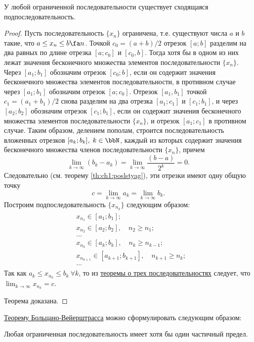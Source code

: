 \begin{thm}\label{th:ch1:TBV}
 У любой ограниченной последовательности существует сходящаяся подпоследовательность.
\end{thm}
\begin{proof}
Пусть последовательность $\{x_n\}$ ограничена, т.е. существуют числа $a$ и $b$ такие, что $a \le x_n \le b \fa n$. Точкой
$c_0 = (a + b)/2$ отрезок $[a; b]$ разделим на два равных по длине отрезка $[a; c_0]$ и $[c_0,b]$. Тогда хотя бы в одном из них лежат значения бесконечного множества элементов последовательности $\{x_n\}$. Через $[a_1;b_1]$ обозначим отрезок $[c_0;b]$, если он содержит значения бесконечного множества элементов последовательности, в противном случае через $[a_1; b_1]$ обозначим отрезок $[a; c_0]$. Отрезок $[a_1, b_1]$ точкой $c_1 = (a_1 + b_1)/2$ снова разделим на два отрезка $[a_1;c_1]$ и $[c_1;b_1]$, и через $[a_2;b_2]$ обозначим отрезок $[c_1;b_1]$, если он содержит значения бесконечного множества элементов последовательности $\{x_n\}$, и отрезок $[a_1; c_1]$ в противном случае. Таким образом, делением пополам, строится последовательность вложенных отрезков $[a_k;b_k],\; k \in \bbN$, каждый из которых содержит значения бесконечного множества членов последовательности $\{x_n\}$, причем
$$
\lim_{k\to \infty}(b_k-a_k)=\lim_{k \to \infty}\frac{(b-a)}{2^k}=0.
$$
Следовательно (см. теорему \ref{th:ch1:poslstyag}), эти отрезки имеют одну общую точку
$$
c = \lim_{k \to \infty} a_k = \lim_{k \to \infty} b_k.
$$
Построим подпоследовательность $\{x_{n_k}\}$ следующим образом:
\begin{gather*}
\begin{aligned}
& x_{n_1} \in [a_1;b_1];\\
& x_{n_2} \in [a_2;b_2],\quad n_2 \ge n_1;\\
& \ldots\\
& x_{n_k} \in [a_k;b_k],\quad n_k \ge n_{k-1};\\
& x_{n_{k+1}} \in [a_{k+1};b_{k+1}],\quad n_{k+1} \ge n_k;\\
& \ldots
\end{aligned}
\end{gather*}
Так как $a_k \le x_{n_k} \le b_k \ \forall k$, то из \hyperref[th:ch1:otrehposled]{теоремы о трех последовательностях} следует, что $\lim_{k \to \infty}\limits x_{n_k} = c$.

Теорема доказана.
\end{proof}

\hyperref[th:ch1:TBV]{Теорему Больцано-Вейерштрасса} можно сформулировать следующим образом: 
\begin{thmn} Любая ограниченная последовательность имеет хотя бы один частичный предел.
\end{thmn}

